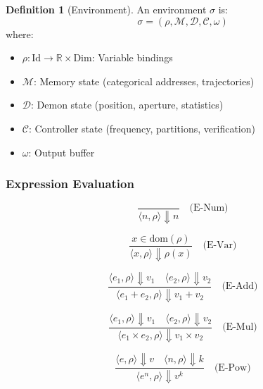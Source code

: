 \documentclass[twocolumn,10pt]{article}
\theoremstyle{definition}
\newtheorem{definition}[theorem]{Definition}
\theoremstyle{remark}
\begin{document}
\begin{definition}[Environment]
An environment $\sigma$ is:
\begin{equation}
    \sigma = (\rho, \mathcal{M}, \mathcal{D}, \mathcal{C}, \omega)
\end{equation}
where:
\begin{itemize}
    \item $\rho : \text{Id} \to \mathbb{R} \times \text{Dim}$: Variable bindings
    \item $\mathcal{M}$: Memory state (categorical addresses, trajectories)
    \item $\mathcal{D}$: Demon state (position, aperture, statistics)
    \item $\mathcal{C}$: Controller state (frequency, partitions, verification)
    \item $\omega$: Output buffer
\end{itemize}
\end{definition}

\subsubsection{Expression Evaluation}

\begin{equation}
    \frac{}{\langle n, \rho\rangle \Downarrow n}
    \quad \text{(E-Num)}
\end{equation}

\begin{equation}
    \frac{x \in \text{dom}(\rho)}{\langle x, \rho\rangle \Downarrow \rho(x)}
    \quad \text{(E-Var)}
\end{equation}

\begin{equation}
    \frac{\langle e_1, \rho\rangle \Downarrow v_1 \quad \langle e_2, \rho\rangle \Downarrow v_2}{\langle e_1 + e_2, \rho\rangle \Downarrow v_1 + v_2}
    \quad \text{(E-Add)}
\end{equation}

\begin{equation}
    \frac{\langle e_1, \rho\rangle \Downarrow v_1 \quad \langle e_2, \rho\rangle \Downarrow v_2}{\langle e_1 \times e_2, \rho\rangle \Downarrow v_1 \times v_2}
    \quad \text{(E-Mul)}
\end{equation}

\begin{equation}
    \frac{\langle e, \rho\rangle \Downarrow v \quad \langle n, \rho\rangle \Downarrow k}{\langle e^n, \rho\rangle \Downarrow v^k}
    \quad \text{(E-Pow)}
\end{equation}
\end{document}
